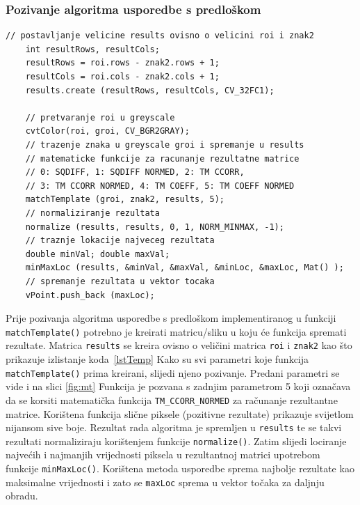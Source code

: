 
\newpage
\subsubsection{Pozivanje algoritma usporedbe s predloškom} %
\label{ssub:Pozivanje algoritma usporedbe s predloškom}

\begin{lstlisting}[label=lstTemp,caption={Izvorni kod pozivanja
algoritma usporedbe s predloškom}]
    // postavljanje velicine results ovisno o velicini roi i znak2
    int resultRows, resultCols;
    resultRows = roi.rows - znak2.rows + 1;
    resultCols = roi.cols - znak2.cols + 1;
    results.create (resultRows, resultCols, CV_32FC1);

    // pretvaranje roi u greyscale
    cvtColor(roi, groi, CV_BGR2GRAY);      
    // trazenje znaka u greyscale groi i spremanje u results
    // matematicke funkcije za racunanje rezultatne matrice
    // 0: SQDIFF, 1: SQDIFF NORMED, 2: TM CCORR,  
    // 3: TM CCORR NORMED, 4: TM COEFF, 5: TM COEFF NORMED
    matchTemplate (groi, znak2, results, 5);
    // normaliziranje rezultata
    normalize (results, results, 0, 1, NORM_MINMAX, -1);
    // traznje lokacije najveceg rezultata
    double minVal; double maxVal;
    minMaxLoc (results, &minVal, &maxVal, &minLoc, &maxLoc, Mat() );
    // spremanje rezultata u vektor tocaka
    vPoint.push_back (maxLoc);

\end{lstlisting}

Prije pozivanja algoritma usporedbe s predloškom implementiranog u
funkciji \texttt{matchTemplate()} potrebno je kreirati matricu/sliku u
koju će funkcija spremati rezultate. Matrica \texttt{results} se kreira
ovisno o veličini matrica \texttt{roi} i \texttt{znak2} kao što
prikazuje izlistanje koda~\ref{lstTemp} Kako su svi parametri koje
funkcija \texttt{matchTemplate()} prima kreirani, slijedi njeno pozivanje. Predani parametri se vide i na slici \ref{fig:mt}
Funkcija je pozvana s zadnjim parametrom 5 koji označava da se korsiti 
matematička funkcija \texttt{TM\_CCORR\_NORMED} za računanje rezultantne
matrice. Korištena funkcija slične piksele (pozitivne rezultate) prikazuje
svijetlom nijansom sive boje.
Rezultat rada algoritma je spremljen u \texttt{results} te se takvi
rezultati normaliziraju korištenjem funkcije \texttt{normalize()}. Zatim
slijedi lociranje najvećih i najmanjih vrijednosti piksela u rezultantnoj
matrici upotrebom funkcije \texttt{minMaxLoc()}. Korištena metoda
usporedbe sprema najbolje rezultate kao maksimalne vrijednosti i zato se
\texttt{maxLoc} sprema u vektor točaka za daljnju obradu.

